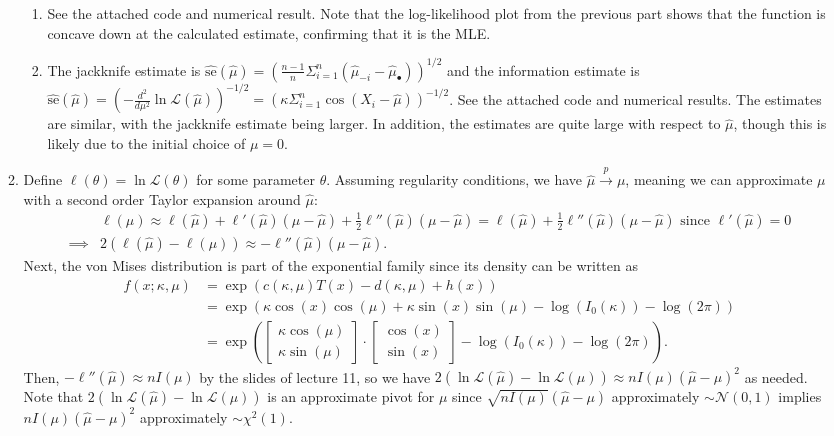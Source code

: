 \documentclass[12pt]{article}
\newcommand{\se}{\text{se}}
\newcommand{\h}[1]{\hat{#1}}
\begin{document}
\begin{enumerate}
\begin{enumerate}
\begin{enumerate}
            \item See the attached code and numerical result. Note that the log-likelihood plot from the previous part shows that the function is concave down at the calculated estimate, confirming that it is the MLE.
                \item The jackknife estimate is $\widehat{\se}(\h{\mu}) = (\frac{n-1}{n}\Sigma_{i=1}^n (\h{\mu}_{-i}-\h{\mu}_\bullet))^{1/2}$ and the information estimate is $\widehat{\se}(\h{\mu}) = (-\frac{d^2}{d\mu^2} \ln\mathcal{L}(\h{\mu}))^{-1/2} = (\kappa\Sigma_{i=1}^n\cos(X_i-\h{\mu}))^{-1/2}$. See the attached code and numerical results. The estimates are similar, with the jackknife estimate being larger. In addition, the estimates are quite large with respect to $\h\mu$, though this is likely due to the initial choice of $\mu = 0$.
        \end{enumerate}
        \item Define $\ell(\theta) = \ln\mathcal{L}(\theta)$ for some parameter $\theta$. Assuming regularity conditions, we have $\h\mu \overset{p}{\to} \mu$, meaning we can approximate $\mu$ with a second order Taylor expansion around $\h\mu$: \begin{align*}
            &\ell(\mu) \approx \ell(\h\mu) + \ell'(\h\mu)(\mu-\h\mu) + \frac{1}{2}\ell''(\h\mu)(\mu-\h\mu) = \ell(\h\mu) + \frac{1}{2}\ell''(\h\mu)(\mu-\h\mu) \text{ since } \ell'(\h\mu) = 0\\
            \implies &2(\ell(\h\mu) - \ell(\mu)) \approx -\ell''(\h\mu)(\mu-\h\mu).
        \end{align*} Next, the von Mises distribution is part of the exponential family since its density can be written as \begin{align*}
            f(x;\kappa,\mu) &= \exp(c(\kappa,\mu)T(x) - d(\kappa,\mu) + h(x))\\
            &= \exp(\kappa\cos(x)\cos(\mu)+\kappa\sin(x)\sin(\mu) - \log(I_0(\kappa)) - \log(2\pi))\\
            &= \exp(\begin{bmatrix} \kappa\cos(\mu) \\ \kappa\sin(\mu) \end{bmatrix} \cdot \begin{bmatrix} \cos(x) \\ \sin(x) \end{bmatrix} - \log(I_0(\kappa)) - \log(2\pi)).
        \end{align*} Then, $-\ell''(\h\mu) \approx nI(\mu)$ by the slides of lecture 11, so we have $2(\ln\mathcal{L}(\h\mu) - \ln\mathcal{L}(\mu)) \approx nI(\mu)(\h\mu - \mu)^2$ as needed. Note that $2(\ln\mathcal{L}(\h\mu) - \ln\mathcal{L}(\mu))$ is an approximate pivot for $\mu$ since $\sqrt{nI(\mu)}(\h\mu - \mu)$ approximately $\sim \mathcal{N}(0,1)$ implies $nI(\mu)(\h\mu - \mu)^2$ approximately $\sim \chi^2(1)$.


\end{enumerate}
\end{enumerate}
\end{document}
